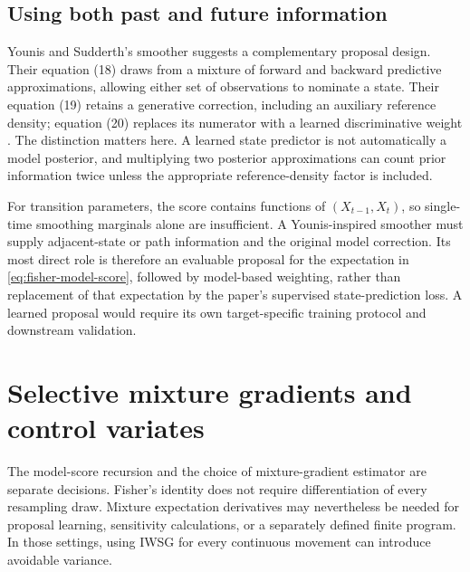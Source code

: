 \documentclass[11pt]{article}
\begin{document}
\subsection{Using both past and future information}

Younis and Sudderth's smoother suggests a complementary proposal design.
Their equation (18) draws from a mixture of forward and backward predictive
approximations, allowing either set of observations to nominate a state.
Their equation (19) retains a generative correction, including an auxiliary
reference density; equation (20) replaces its numerator with a learned
discriminative weight \citep[Section 4]{younis2024}. The distinction matters
here. A learned state predictor is not automatically a model posterior, and
multiplying two posterior approximations can count prior information twice
unless the appropriate reference-density factor is included.

For transition parameters, the score contains functions of
$(X_{t-1},X_t)$, so single-time smoothing marginals alone are insufficient.
A Younis-inspired smoother must supply adjacent-state or path information
and the original model correction. Its most direct role is therefore an
evaluable proposal for the expectation in \eqref{eq:fisher-model-score},
followed by model-based weighting, rather than replacement of that expectation
by the paper's supervised state-prediction loss. A learned proposal would
require its own target-specific training protocol and downstream validation.


\section{Selective mixture gradients and control variates}
\label{sec:hybrid}

The model-score recursion and the choice of mixture-gradient estimator are
separate decisions. Fisher's identity does not require differentiation of
every resampling draw. Mixture expectation derivatives may nevertheless be
needed for proposal learning, sensitivity calculations, or a separately
defined finite program. In those settings, using IWSG for every continuous
movement can introduce avoidable variance.
\end{document}

